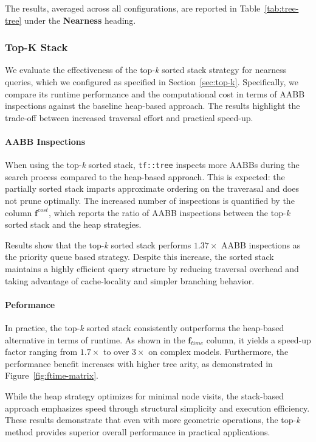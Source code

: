 The results, averaged across all configurations, are reported in
Table~\ref{tab:tree-tree} under the \textbf{Nearness} heading.

\subsubsection{Top-K Stack}\label{sec:topk}

We evaluate the effectiveness of the top-\emph{k}
sorted stack strategy for nearness queries, which we configured
as specified in Section~\ref{sec:top-k}. Specifically, we compare
its runtime performance and the computational cost in terms of AABB
inspections against the baseline heap-based approach. The results
highlight the trade-off between increased traversal effort and
practical speed-up.




\paragraph*{AABB Inspections}

When using the top-\emph{k} sorted stack, \texttt{tf::tree} inspects
more AABBs during the search process compared to the heap-based
approach. This is expected: the partially sorted stack imparts approximate
ordering on the traverasal and does not prune optimally.
The increased number of inspections is quantified by the column
$\mathbf{f}^{\mathit{cost}}$, which reports the ratio of AABB
inspections between the top-\emph{k} sorted stack and the heap strategies.

Results show that the top-\emph{k} sorted stack performs $1.37\times$
AABB inspections as the priority queue based strategy.
Despite this increase, the sorted stack maintains a highly efficient
query structure by reducing traversal overhead and taking advantage
of cache-locality and simpler branching behavior.

\paragraph*{Peformance}

In practice, the top-\emph{k} sorted stack consistently outperforms
the heap-based alternative in terms of runtime. As shown in the
$\mathbf{f}_{\mathit{time}}$ column, it yields a speed-up factor
ranging from $1.7\times$ to over $3\times$ on complex models.
Furthermore, the performance benefit increases with
higher tree arity, as demonstrated in Figure~\ref{fig:ftime-matrix}.

While the heap strategy optimizes for minimal node visits, the
stack-based approach emphasizes speed through structural simplicity
and execution efficiency. These results demonstrate that even with
more geometric operations, the top-\emph{k} method provides
superior overall performance in practical applications.
